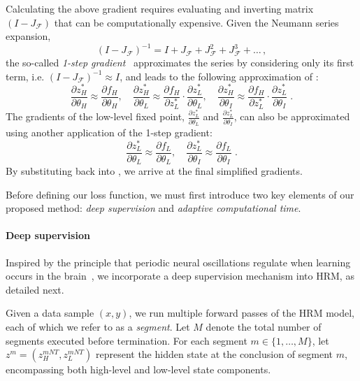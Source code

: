 Calculating the above gradient requires evaluating and inverting matrix $(I - J_{\mathcal{F}})$ that can be computationally expensive. Given the Neumann series expansion,
\begin{equation*}
(I - J_{\mathcal{F}})^{-1} = I + J_{\mathcal{F}} + J_{\mathcal{F}}^2 + J_{\mathcal{F}}^3 + \dots \,,
\end{equation*}
the so-called \textit{1-step gradient}~\cite{Geng2021OnTI} approximates the series by considering only its first term, i.e. $(I - J_{\mathcal{F}})^{-1} \approx I$, and leads to the following approximation of :  
\begin{equation}
\label{eq:1-step-1}
\frac{\partial z_H^*}{\partial\theta_H} \approx \frac{\partial f_H}{\partial \theta_H},
\quad
\frac{\partial z_H^*}{\partial\theta_L}\approx \frac{\partial f_H}{\partial z^*_L} \cdot \frac{\partial z^*_L}{\partial \theta_L},
\quad
\frac{\partial z_H^*}{\partial\theta_I} \approx \frac{\partial f_H}{\partial z^*_L} \cdot
\frac{\partial z^*_L}{\partial \theta_I} \;.
\end{equation}
The gradients of the low-level fixed point, $\frac{\partial z^*_L}{\partial \theta_L}$ and $\frac{\partial z^*_L}{\partial \theta_I}$, can also be approximated using another application of the 1-step gradient:
\begin{equation}
\label{eq:1-step-2}
\frac{\partial z^*_L}{\partial \theta_L} \approx \frac{\partial f_L}{\partial \theta_L},
\quad
\frac{\partial z^*_L}{\partial \theta_I} \approx \frac{\partial f_L}{\partial \theta_I} \;.
\end{equation}
By substituting  back into , we arrive at the final simplified gradients.

Before defining our loss function, we must first introduce two key elements of our proposed method: \textit{deep supervision} and \textit{adaptive computational time}.

\paragraph{Deep supervision}
Inspired by the principle that periodic neural oscillations regulate when learning occurs in the brain~\cite{BEGUS2020100810}, we incorporate a deep supervision mechanism into HRM, as detailed next. 

Given a data sample $(x, y)$, we run multiple forward passes of the HRM model, each of which we refer to as a \textit{segment}. Let $M$ denote the total number of segments executed before termination. For each segment $m \in \{1, \dots, M\}$, let $z^m = (z^{mNT}_H, z^{mNT}_L)$ represent the hidden state at the conclusion of segment $m$, encompassing both high-level and low-level state components.

